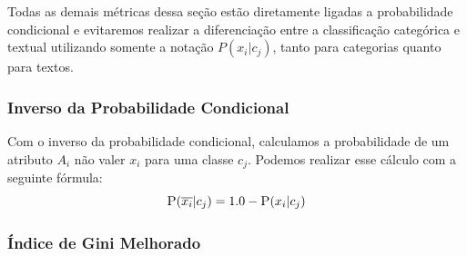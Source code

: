 Todas as demais métricas dessa seção estão diretamente ligadas a probabilidade condicional e evitaremos realizar a diferenciação entre a classificação categórica e textual utilizando somente a notação $P(x_i|c_j)$, tanto para categorias quanto para textos.


\subsubsection{Inverso da Probabilidade Condicional}%
\label{subsubsection::pc'}
Com o inverso da probabilidade condicional, calculamos a probabilidade de um atributo $A_i$ não valer $x_i$ para uma classe $c_j$. Podemos realizar esse cálculo com a seguinte fórmula:
\begin{equation}\label{eqn::plinhattalquec}
 \textsc{P}(\overline{x_i}|c_j) = 1.0 - \textsc{P}(x_i|c_j)
\end{equation}

\subsubsection{Índice de Gini Melhorado} %
\label{subsubsection::gini}

